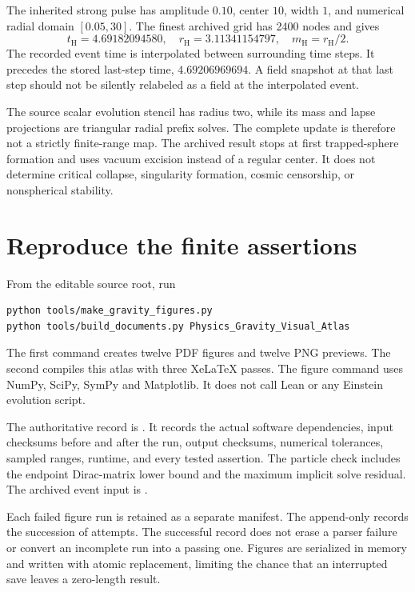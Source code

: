 The inherited strong pulse has amplitude $0.10$, center $10$, width $1$, and numerical radial domain $[0.05,30]$. The finest archived grid has 2400 nodes and gives
\[
t_{\mathrm H}=4.69182094580,\quad
r_{\mathrm H}=3.11341154797,\quad
m_{\mathrm H}=r_{\mathrm H}/2.
\]
The recorded event time is interpolated between surrounding time steps. It precedes the stored last-step time, $4.69206969694$. A field snapshot at that last step should not be silently relabeled as a field at the interpolated event.

The source scalar evolution stencil has radius two, while its mass and lapse projections are triangular radial prefix solves. The complete update is therefore not a strictly finite-range map. The archived result stops at first trapped-sphere formation and uses vacuum excision instead of a regular center. It does not determine critical collapse, singularity formation, cosmic censorship, or nonspherical stability.



\clearpage
\section{Reproduce the finite assertions}

From the editable source root, run
\begin{lstlisting}
python tools/make_gravity_figures.py
python tools/build_documents.py Physics_Gravity_Visual_Atlas
\end{lstlisting}
The first command creates twelve PDF figures and twelve PNG previews. The second compiles this atlas with three XeLaTeX passes. The figure command uses NumPy, SciPy, SymPy and Matplotlib. It does not call Lean or any Einstein evolution script.

The authoritative record is . It records the actual software dependencies, input checksums before and after the run, output checksums, numerical tolerances, sampled ranges, runtime, and every tested assertion. The particle check includes the endpoint Dirac-matrix lower bound and the maximum implicit solve residual. The archived event input is .

Each failed figure run is retained as a separate manifest. The append-only  records the succession of attempts. The successful record does not erase a parser failure or convert an incomplete run into a passing one. Figures are serialized in memory and written with atomic replacement, limiting the chance that an interrupted save leaves a zero-length result.

